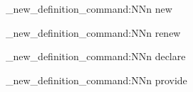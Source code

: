 \acro_new_definition_command:NNn
  \NewAcroCommand
  \NewDocumentCommand
  {new}

\acro_new_definition_command:NNn
  \RenewAcroCommand
  \RenewDocumentCommand
  {renew}

\acro_new_definition_command:NNn
  \DeclareAcroCommand
  \DeclareDocumentCommand
  {declare}

\acro_new_definition_command:NNn
  \ProvideAcroCommand
  \ProvideDocumentCommand
  {provide}

\AcroModuleEnd
